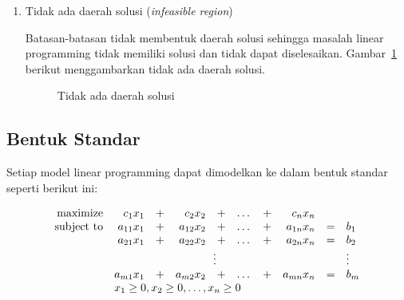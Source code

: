 \begin{enumerate}
	\item Tidak ada daerah solusi (\textit{infeasible region})

		Batasan-batasan tidak membentuk daerah solusi sehingga masalah linear programming tidak memiliki solusi dan tidak dapat diselesaikan. Gambar~\ref{fig:tidak_ada_daerah_solusi} berikut menggambarkan tidak ada daerah solusi.
			
		\begin{figure}[H]
    		\centering
			\caption{Tidak ada daerah solusi}
			\label{fig:tidak_ada_daerah_solusi}
    	\end{figure}

\end{enumerate}

\subsection{Bentuk Standar}
\label{bentuk_standar}

Setiap model linear programming dapat dimodelkan ke dalam bentuk standar seperti berikut ini:
    	
\begin{equation*}
	\begin{array}{r r c r c r c r c l}
	    \text{maximize}		& c_1x_1    & + & c_2x_2 	& + & \dots & + & c_nx_n \\
		\text{subject to} 	& a_{11}x_1 & + & a_{12}x_2 & + & \dots & + & a_{1n}x_n & = & b_1 \\
    						& a_{21}x_1 & + & a_{22}x_2 & + & \dots & + & a_{2n}x_n & = & b_2 \\
                            & \multicolumn{7}{c}{\vdots}                            &   & \vdots \\
                            & a_{m1}x_1 & + & a_{m2}x_2 & + & \dots & + & a_{mn}x_n & = & b_m \\
                            & \multicolumn{9}{l}{x_1\geq0,x_2\geq0,\dots,x_n\geq0}
	\end{array}
\end{equation*}

